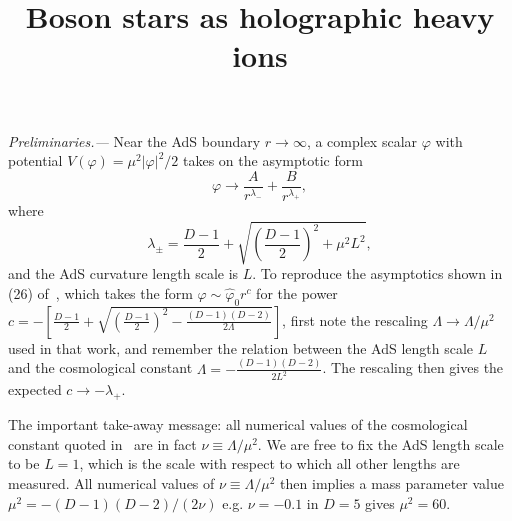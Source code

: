 \documentclass[prl,twocolumn,superscriptaddress]{revtex4-1}
\newcommand{\PRLsection}[1]{\emph{#1.---}}
\begin{document}
\title{Boson stars as holographic heavy ions}

\author{}

\maketitle

\PRLsection{Preliminaries}
Near the AdS boundary $r\rightarrow\infty$, a complex scalar $\varphi$ with potential $V(\varphi)=\mu^2 |\varphi|^2 /2$ takes on the asymptotic form\cite{Henneaux:2006hk,Marolf:2006nd}
\begin{equation}
\varphi \rightarrow \frac{A}{r^{\lambda_-}} + \frac{B}{r^{\lambda_+}},
\end{equation}
where 
\begin{equation}
\lambda_{\pm} = \frac{D-1}{2}+\sqrt{\left( \frac{D-1}{2} \right)^2 + \mu^2 L^2},
\end{equation}
and the AdS curvature length scale is $L$. 
To reproduce the asymptotics shown in (26) of~\cite{Astefanesei:2003qy}, which takes the form $\varphi \sim \hat{\varphi}_0 r^c$ for the power $c=-\left[ \frac{D-1}{2} + \sqrt{\left( \frac{D-1}{2} \right)^2 - \frac{(D-1)(D-2)}{2\Lambda}} \right]$, first note the rescaling $\Lambda \rightarrow \Lambda/\mu^2$ used in that work, and remember the relation between the AdS length scale $L$ and the cosmological constant $\Lambda=-\frac{(D-1)(D-2)}{2 L^2}$.
The rescaling then gives the expected $c\rightarrow -\lambda_+$.

The important take-away message: all numerical values of the cosmological constant quoted in~\cite{Astefanesei:2003qy} are in fact $\nu\equiv\Lambda/\mu^2$. 
We are free to fix the AdS length scale to be $L=1$, which is the scale with respect to which all other lengths are measured. 
All numerical values of $\nu\equiv\Lambda/\mu^2$ then implies a mass parameter value $\mu^2=-(D-1)(D-2)/(2\nu)$ e.g. $\nu=-0.1$ in $D=5$ gives $\mu^2=60$.
\end{document}
